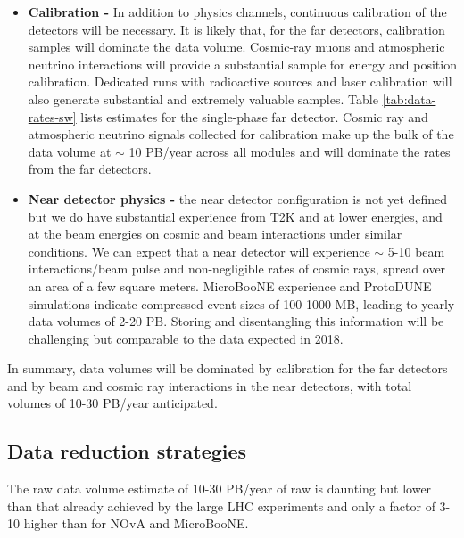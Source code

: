 \begin{itemize}
\item
{\bf Calibration - }
In addition to physics channels, continuous calibration of the detectors will be necessary.  It is likely that, for the far detectors, calibration samples will  dominate the data volume. Cosmic-ray muons and atmospheric neutrino interactions will provide a substantial sample for energy and position calibration.  Dedicated runs with radioactive sources and laser calibration will also generate substantial and extremely valuable samples. Table \ref{tab:data-rates-sw} lists estimates for the single-phase far detector.   Cosmic ray and atmospheric neutrino signals collected for calibration make up the bulk of the data volume at $\sim$ 10 PB/year across all modules and will dominate the rates from the far detectors.  %

\item {\bf Near detector physics -} the near detector configuration is not yet defined  but we do have substantial experience from T2K and   at lower energies, and   at the   beam energies on cosmic and beam interactions under similar conditions.  We can expect that a near detector will experience $\sim$ 5-10 beam interactions/beam pulse and non-negligible rates of cosmic rays, spread over an area of a few square meters. MicroBooNE experience and ProtoDUNE simulations indicate compressed event sizes of 100-1000 MB, leading to yearly data volumes of 2-20 PB.  Storing and disentangling this information will be challenging but comparable to the  data expected in 2018.

\end{itemize}

In summary, data volumes will be dominated by calibration for the far detectors and by beam and cosmic ray interactions in the near detectors, with total volumes of 10-30 PB/year anticipated. 



\subsection{Data reduction strategies}

The raw data volume estimate of 10-30 PB/year of raw is daunting but lower than that already achieved by the large LHC experiments and only a factor of 3-10 higher than for NOvA and MicroBooNE. 

